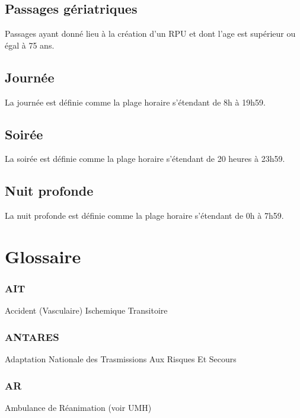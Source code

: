 \documentclass[12pt,english,french,twoside]{report}\usepackage[]{graphicx}\usepackage[]{color}
\begin{document}
\section*{Passages gériatriques}
Passages ayant donné lieu à la création d'un RPU et dont l'age est supérieur ou égal à 75 ans.

\section*{Journée}
La journée est définie comme la plage horaire s'étendant de 8h à 19h59.

\section*{Soirée}
La soirée est définie comme la plage horaire s'étendant de 20 heures à 23h59.

\section*{Nuit profonde}
La nuit profonde est définie comme la plage horaire s'étendant de 0h à 7h59.




\newpage
\chapter{Glossaire}





\subsection*{AIT}
Accident (Vasculaire) Ischemique Transitoire

\subsection*{ANTARES}
Adaptation Nationale des Trasmissions Aux Risques Et Secours

\subsection*{AR}
Ambulance de Réanimation (voir UMH)
\end{document}
